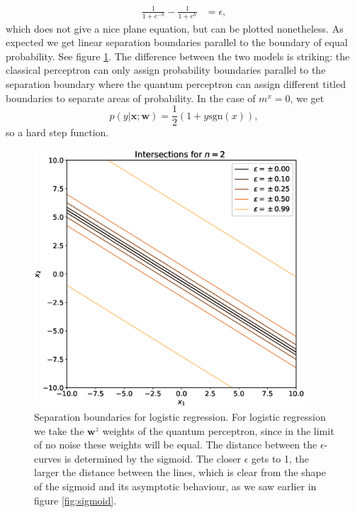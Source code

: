 \begin{align*}
    \frac{1}{1+e^{-h}} - \frac{1}{1+e^{h}} &= \epsilon,
\end{align*}
which does not give a nice plane equation, but can be plotted nonetheless. As expected we get linear separation boundaries parallel to the boundary of equal probability. See figure \ref{fig:int_cl_exact_mirror}. The difference between the two models is striking: the classical perceptron can only assign probability boundaries parallel to the separation boundary where the quantum perceptron can assign different titled boundaries to separate areas of probability. In the case of $m^x=0$, we get 
\begin{equation*}
    p(y|\mathbf{x};\mathbf{w}) = \frac{1}{2}\left(1+ y \text{sgn}(x)\right),
\end{equation*}
so a hard step function.
\begin{figure}[ht!]
    \centering
    \includegraphics[width = 0.9\textwidth]{figures/chapter3/intersections_cl_exact_mirror.eps}
    \caption{Separation boundaries for logistic regression. For logistic regression we take the $\mathbf{w}^z$ weights of the quantum perceptron, since in the limit of no noise these weights will be equal. The distance between the $\epsilon$-curves is determined by the sigmoid. The closer $\epsilon$ gets to 1, the larger the distance between the lines, which is clear from the shape of the sigmoid and its asymptotic behaviour, as we saw earlier in figure \ref{fig:sigmoid}.}
    \label{fig:int_cl_exact_mirror}
\end{figure}


